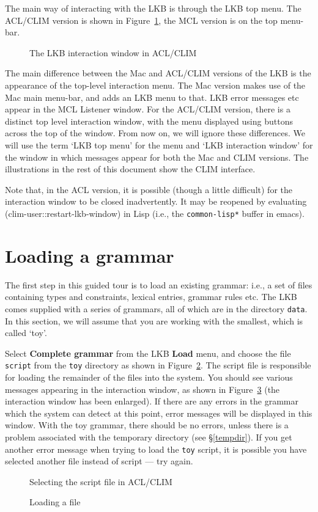 \documentclass[12pt]{report}
\begin{document}
The main way of interacting with the LKB is through the LKB top menu.
The ACL/CLIM version is shown in Figure~\ref{lunix2}, the MCL version
is on the top menu-bar.
\begin{figure}
\caption{The LKB interaction window in ACL/CLIM}
\label{lunix2}
\end{figure}
The main difference between the Mac and ACL/CLIM versions of the
LKB is the appearance of the top-level interaction menu.
The Mac version makes use of the Mac main menu-bar, and adds an LKB
menu to that.  LKB error messages etc appear in the MCL
Listener window.  For the ACL/CLIM version, there is a distinct
top level interaction window, with the menu displayed using
buttons across the top of the window.  From now on,
we will ignore these differences.
We will use the term `LKB top menu' 
for the menu and `LKB interaction window' for the window in which messages 
appear
for both the Mac and CLIM versions.  The illustrations in 
the rest of this
document show the CLIM interface.

Note that, in the ACL version, it is possible (though 
a little difficult) for the interaction
window to be closed inadvertently.
It may be reopened by evaluating
(clim-user::restart-lkb-window) in Lisp (i.e., the
{\tt *common-lisp*} buffer in emacs).

\section{Loading a grammar}
\label{gramload}

The first step in this guided tour is to load an existing grammar: i.e.,
a set of files containing types and constraints, 
lexical entries, grammar rules etc.  
The LKB comes supplied with a series of grammars,
all of which are in the directory \verb+data+.  In this section, we
will assume that you are working with the smallest, which is called
`toy'.  

Select {\bf Complete grammar} from the LKB {\bf Load}
menu, and choose the file {\tt script} from the {\tt toy} directory
as shown in Figure~\ref{loadscript}.  The script file is responsible for
loading the remainder of the files into the system.  You should see various
messages appearing in the interaction window, as shown in
Figure~\ref{loadmess}
(the interaction window has been enlarged).  
If there are any errors in the grammar which the system
can detect at this point, error messages will be displayed in this window.
With the toy grammar, there should be no errors, unless there is a problem 
associated with the temporary directory (see \S\ref{tempdir}).
If
you get another error message when trying to load the {\tt toy} script, it is
possible you have selected another file instead of script --- try again.
\begin{figure}
\epsfxsize=3in
\caption{Selecting the script file in ACL/CLIM}
\label{loadscript}
\end{figure}
\begin{figure}
\caption{Loading a file}
\label{loadmess}
\end{figure}
\end{document}
